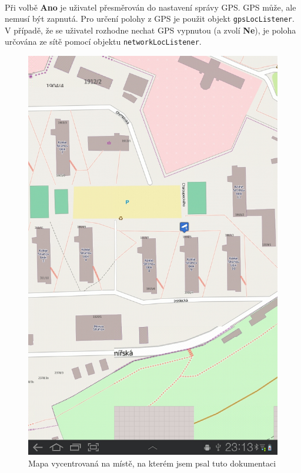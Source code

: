 \paragraph{}
Při volbě \textbf{Ano} je uživatel přesměrován do nastavení správy GPS. GPS může, ale nemusí být zapnutá. Pro určení polohy z GPS je použit objekt \texttt{gpsLocListener}. V případě, že se uživatel rozhodne nechat GPS vypnutou (a zvolí \textbf{Ne}), je poloha určována ze sítě pomocí objektu \texttt{networkLocListener}. 
\begin{figure}[!ht]
\begin{center}
\includegraphics[scale=0.07]{pics/mapa.jpg}
\caption{Mapa vycentrovaná na místě, na kterém jsem psal tuto dokumentaci}
\end{center}
\end{figure}
